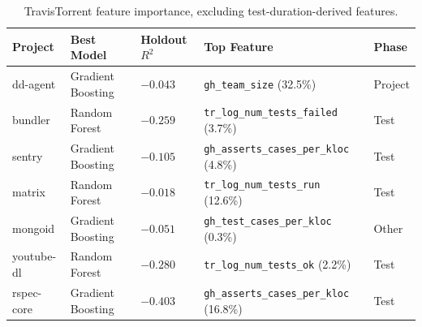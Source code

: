 \documentclass[technologies,article,submit,pdftex,moreauthors]{Definitions/mdpi}
\begin{document}
{\def\LTcaptype{none} %
\begin{table}[H]
\centering
\caption{TravisTorrent feature importance, excluding test-duration-derived features.\label{tab:travistorrent_fi_excl}}
\begin{tabular}{@{}
  >{\raggedright\arraybackslash}p{}
  >{\raggedright\arraybackslash}p{}
  >{\raggedright\arraybackslash}p{}
  >{\raggedright\arraybackslash}p{}
  >{\raggedright\arraybackslash}p{}@{}}
\toprule
\begin{minipage}[b]{\linewidth}\raggedright
\textbf{Project}
\end{minipage} & \begin{minipage}[b]{\linewidth}\raggedright
\textbf{Best Model}
\end{minipage} & \begin{minipage}[b]{\linewidth}\raggedright
\textbf{Holdout \(R^2\)}
\end{minipage} & \begin{minipage}[b]{\linewidth}\raggedright
\textbf{Top Feature}
\end{minipage} & \begin{minipage}[b]{\linewidth}\raggedright
\textbf{Phase}
\end{minipage} \\
\midrule
dd-agent & Gradient Boosting & \(-0.043\) & \texttt{gh\_team\_size} (32.5\%) & Project \\
bundler & Random Forest & \(-0.259\) & \texttt{tr\_\allowbreak log\_\allowbreak num\_\allowbreak tests\_\allowbreak failed} (3.7\%) & Test \\
sentry & Gradient Boosting & \(-0.105\) & \texttt{gh\_\allowbreak asserts\_\allowbreak cases\_\allowbreak per\_\allowbreak kloc} (4.8\%) & Test \\
matrix & Random Forest & \(-0.018\) & \texttt{tr\_\allowbreak log\_\allowbreak num\_\allowbreak tests\_\allowbreak run} (12.6\%) & Test \\
mongoid & Gradient Boosting & \(-0.051\) & \texttt{gh\_\allowbreak test\_\allowbreak cases\_\allowbreak per\_\allowbreak kloc} (0.3\%) & Other \\
youtube-dl & Random Forest & \(-0.280\) & \texttt{tr\_\allowbreak log\_\allowbreak num\_\allowbreak tests\_\allowbreak ok} (2.2\%) & Test \\
rspec-core & Gradient Boosting & \(-0.403\) & \texttt{gh\_\allowbreak asserts\_\allowbreak cases\_\allowbreak per\_\allowbreak kloc} (16.8\%) & Test \\
\bottomrule
\end{tabular}
\end{table}
}
\end{document}
